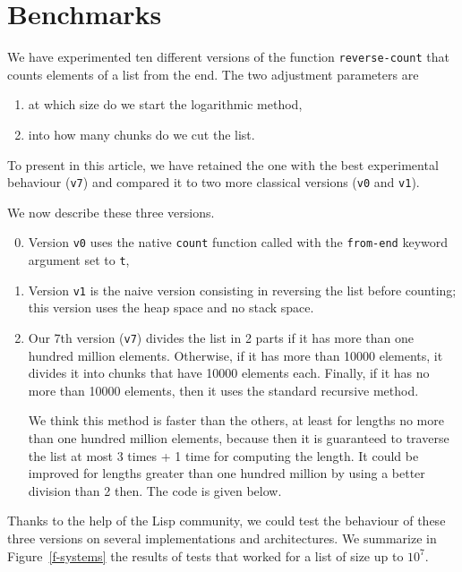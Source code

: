 \section{Benchmarks}
We have experimented ten different versions of the function \texttt{reverse-count}
that counts elements of a list from the end. The two adjustment parameters are
\begin{enumerate}
\item at which size do we start the logarithmic method,
\item into how many chunks do we cut the list.
\end{enumerate}

To present in this article, 
we have retained the one with the best experimental behaviour (\texttt{v7})
and compared it to two more classical versions  (\texttt{v0} and \texttt{v1}).

We now describe these three versions.

\begin{enumerate}
\setcounter{enumi}{-1}
\item Version \texttt{v0} uses the native \texttt{count} function called with the \texttt{from-end} keyword argument set to \texttt{t},
\item Version \texttt{v1} is the naive version consisting in reversing the list 
before counting; this version uses the heap space and no stack space.
\setcounter{enumi}{6}
\item Our 7th version (\texttt{v7}) divides the list in 2 parts 
if it has more than one 
hundred million elements.  Otherwise, if it has more than 10000
elements, it divides it into chunks that have 10000 elements each.
Finally, if it has no more than 10000 elements, then it uses the
standard recursive method.

We think this method is faster than the others, at least for
lengths no more than one hundred million elements, because then it
is guaranteed to traverse the list at most 3 times + 1 time for
computing the length.  It could be improved for lengths greater
than one hundred million by using a better division than 2 then.
The code is given below.
\end{enumerate}


Thanks to the help of the Lisp community, we could test the behaviour
of these three versions on several implementations and architectures.
We summarize in Figure~\ref{f-systems} the results of tests that 
worked for a list of size up to $10^7$.

